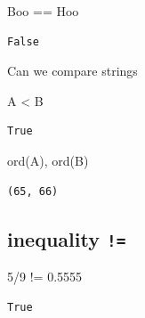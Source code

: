 \documentclass[
  letterpaper,
  DIV=11,
  numbers=noendperiod]{scrreprt}
\newenvironment{Shaded}{\begin{snugshade}}{\end{snugshade}}
\newcommand{\BuiltInTok}[1]{\textcolor[rgb]{0.00,0.23,0.31}{#1}}
\newcommand{\CommentTok}[1]{\textcolor[rgb]{0.37,0.37,0.37}{#1}}
\newcommand{\DecValTok}[1]{\textcolor[rgb]{0.68,0.00,0.00}{#1}}
\newcommand{\FloatTok}[1]{\textcolor[rgb]{0.68,0.00,0.00}{#1}}
\newcommand{\NormalTok}[1]{\textcolor[rgb]{0.00,0.23,0.31}{#1}}
\newcommand{\OperatorTok}[1]{\textcolor[rgb]{0.37,0.37,0.37}{#1}}
\newcommand{\StringTok}[1]{\textcolor[rgb]{0.13,0.47,0.30}{#1}}
\begin{document}
\begin{Shaded}
\begin{Highlighting}[]
\CommentTok{\textquotesingle{}Boo\textquotesingle{}} \OperatorTok{==} \StringTok{\textquotesingle{}Hoo\textquotesingle{}}
\end{Highlighting}
\end{Shaded}

\begin{verbatim}
False
\end{verbatim}

Can we compare strings

\begin{Shaded}
\begin{Highlighting}[]
\CommentTok{\textquotesingle{}A\textquotesingle{}} \OperatorTok{\textless{}} \StringTok{\textquotesingle{}B\textquotesingle{}}
\end{Highlighting}
\end{Shaded}

\begin{verbatim}
True
\end{verbatim}

\begin{Shaded}
\begin{Highlighting}[]
\BuiltInTok{ord}\NormalTok{(}\StringTok{\textquotesingle{}A\textquotesingle{}}\NormalTok{), }\BuiltInTok{ord}\NormalTok{(}\StringTok{\textquotesingle{}B\textquotesingle{}}\NormalTok{)}
\end{Highlighting}
\end{Shaded}

\begin{verbatim}
(65, 66)
\end{verbatim}

\hypertarget{inequality}{%
\subsection{\texorpdfstring{inequality
\texttt{!=}}{inequality !=}}\label{inequality}}

\begin{Shaded}
\begin{Highlighting}[]
\DecValTok{5}\OperatorTok{/}\DecValTok{9} \OperatorTok{!=} \FloatTok{0.5555}
\end{Highlighting}
\end{Shaded}

\begin{verbatim}
True
\end{verbatim}
\end{document}
